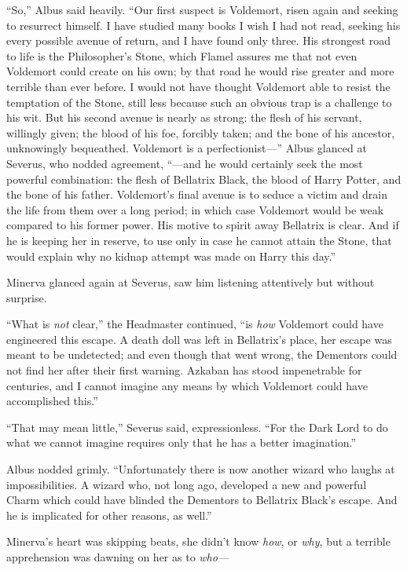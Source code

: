 “So,” Albus said heavily.
“Our first suspect is Voldemort, risen again and seeking to resurrect himself. I have studied many books I wish I had not read, seeking his every possible avenue of return, and I have found only three. His strongest road to life is the Philosopher’s Stone, which Flamel assures me that not even Voldemort could create on his own; by that road he would rise greater and more terrible than ever before. I would not have thought Voldemort able to resist the temptation of the Stone, still less because such an obvious trap is a challenge to his wit. But his second avenue is nearly as strong: the flesh of his servant, willingly given; the blood of his foe, forcibly taken; and the bone of his ancestor, unknowingly bequeathed. Voldemort is a perfectionist—” Albus glanced at Severus, who nodded agreement, “—and he would certainly seek the most powerful combination: the flesh of Bellatrix Black, the blood of Harry Potter, and the bone of his father. Voldemort’s final avenue is to seduce a victim and drain the life from them over a long period; in which case Voldemort would be weak compared to his former power. His motive to spirit away Bellatrix is clear. And if he is keeping her in reserve, to use only in case he cannot attain the Stone, that would explain why no kidnap attempt was made on Harry this day.”

Minerva glanced again at Severus, saw him listening attentively but without surprise.

“What is \emph{not} clear,” the Headmaster continued, “is \emph{how} Voldemort could have engineered this escape. A death doll was left in Bellatrix’s place, her escape was meant to be undetected; and even though that went wrong, the Dementors could not find her after their first warning. Azkaban has stood impenetrable for centuries, and I cannot imagine any means by which Voldemort could have accomplished this.”

“That may mean little,” Severus said, expressionless.
“For the Dark Lord to do what we cannot imagine requires only that he has a better imagination.”

Albus nodded grimly.
“Unfortunately there is now another wizard who laughs at impossibilities. A wizard who, not long ago, developed a new and powerful Charm which could have blinded the Dementors to Bellatrix Black’s escape. And he is implicated for other reasons, as well.”

Minerva’s heart was skipping beats, she didn’t know \emph{how}, or \emph{why}, but a terrible apprehension was dawning on her as to \emph{who—}

